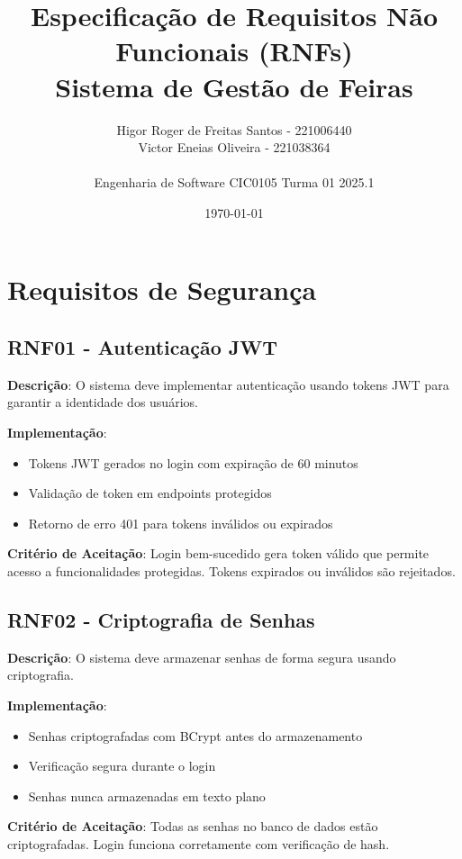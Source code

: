 \documentclass[12pt,a4paper]{article}
\title{\textbf{Especificação de Requisitos Não Funcionais (RNFs)}\\
\large Sistema de Gestão de Feiras}
\author{Higor Roger de Freitas Santos - 221006440\\
Victor Eneias Oliveira - 221038364\\
\\
Engenharia de Software CIC0105 Turma 01 2025.1}
\date{\today}
\begin{document}
\maketitle

\tableofcontents
\newpage

\section{Requisitos de Segurança}

\subsection{RNF01 - Autenticação JWT}

\textbf{Descrição}: O sistema deve implementar autenticação usando tokens JWT para garantir a identidade dos usuários.

\textbf{Implementação}:
\begin{itemize}
    \item Tokens JWT gerados no login com expiração de 60 minutos
    \item Validação de token em endpoints protegidos
    \item Retorno de erro 401 para tokens inválidos ou expirados
\end{itemize}

\textbf{Critério de Aceitação}: Login bem-sucedido gera token válido que permite acesso a funcionalidades protegidas. Tokens expirados ou inválidos são rejeitados.

\subsection{RNF02 - Criptografia de Senhas}

\textbf{Descrição}: O sistema deve armazenar senhas de forma segura usando criptografia.

\textbf{Implementação}:
\begin{itemize}
    \item Senhas criptografadas com BCrypt antes do armazenamento
    \item Verificação segura durante o login
    \item Senhas nunca armazenadas em texto plano
\end{itemize}

\textbf{Critério de Aceitação}: Todas as senhas no banco de dados estão criptografadas. Login funciona corretamente com verificação de hash.
\end{document}
